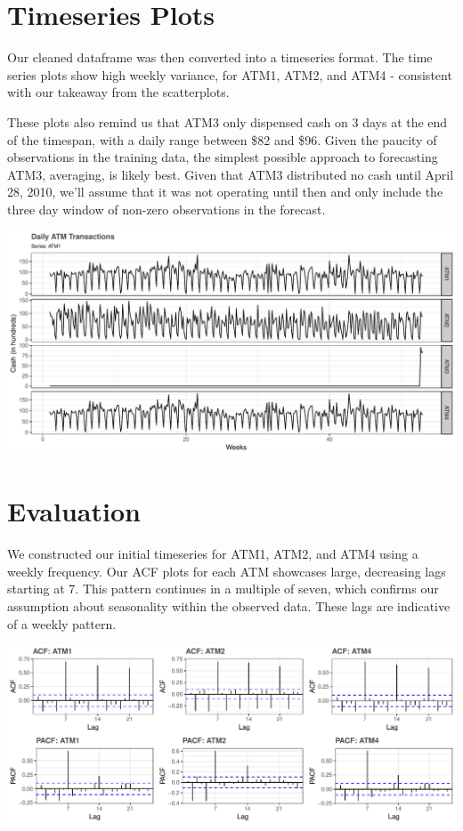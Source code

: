 \documentclass[openany]{book}
\begin{document}
\hypertarget{timeseries-plots}{%
\section{Timeseries Plots}\label{timeseries-plots}}

Our cleaned dataframe was then converted into a timeseries format. The
time series plots show high weekly variance, for ATM1, ATM2, and ATM4 -
consistent with our takeaway from the scatterplots.

These plots also remind us that ATM3 only dispensed cash on 3 days at
the end of the timespan, with a daily range between \$82 and \$96. Given
the paucity of observations in the training data, the simplest possible
approach to forecasting ATM3, averaging, is likely best. Given that ATM3
distributed no cash until April 28, 2010, we'll assume that it was not
operating until then and only include the three day window of non-zero
observations in the forecast.

\includegraphics{Part-A-JM_JO_files/figure-latex/unnamed-chunk-4-1.pdf}

\hypertarget{evaluation}{%
\section{Evaluation}\label{evaluation}}

We constructed our initial timeseries for ATM1, ATM2, and ATM4 using a
weekly frequency. Our ACF plots for each ATM showcases large, decreasing
lags starting at 7. This pattern continues in a multiple of seven, which
confirms our assumption about seasonality within the observed data.
These lags are indicative of a weekly pattern. \newline

\includegraphics{Part-A-JM_JO_files/figure-latex/unnamed-chunk-5-1.pdf}
\end{document}

